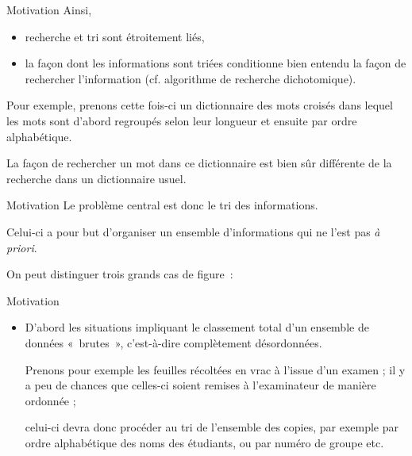\begin{frame}{Motivation}
	Ainsi, 
	\begin{itemize}
		\item
		recherche et tri sont étroitement liés, 
		\item
		la façon dont les informations sont triées conditionne 
		bien entendu la façon de rechercher l’information 
		(cf. algorithme de recherche dichotomique).
	\end{itemize}
	
	Pour exemple, prenons cette fois-ci un dictionnaire des mots croisés
	dans lequel les mots sont d’abord regroupés selon leur longueur et
	ensuite par ordre alphabétique. 
	
	La façon de rechercher un mot dans ce
	dictionnaire est bien sûr différente de la recherche dans un
	dictionnaire usuel. 
\end{frame}

\begin{frame}{Motivation}
	Le problème central est donc le tri des informations. 
	
	\bigskip
	
	Celui-ci a pour	but d’organiser un ensemble 
	d’informations qui ne l’est pas \textit{à
	priori}. 
	
	\bigskip
	
	On peut distinguer trois grands cas de figure~:
\end{frame}

\begin{frame}{Motivation}
	\begin{itemize}
		\item 
			D’abord les situations impliquant le classement total d’un ensemble de
			données «~brutes~», c’est-à-dire complètement désordonnées. 
			
			Prenons	pour exemple les feuilles récoltées en vrac à l’issue 
			d’un examen ; il y a peu de chances que celles-ci soient remises 
			à l’examinateur de	manière ordonnée ; 
			
			celui-ci devra donc procéder au tri de l’ensemble
			des copies, par exemple par ordre alphabétique des noms des étudiants,
			ou par numéro de groupe etc.
	\end{itemize}
\end{frame}
	
